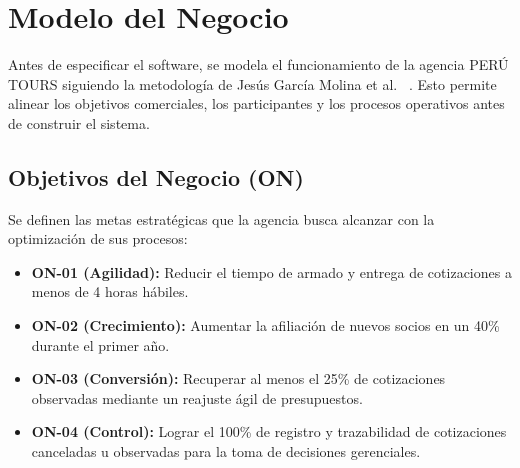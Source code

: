 \section{Modelo del Negocio}
Antes de especificar el software, se modela el funcionamiento de la agencia PERÚ TOURS siguiendo la metodología de Jesús García Molina et al.~\cite{garciamolina} %
. Esto permite alinear los objetivos comerciales, los participantes y los procesos operativos antes de construir el sistema.

\subsection{Objetivos del Negocio (ON)}
Se definen las metas estratégicas que la agencia busca alcanzar con la optimización de sus procesos:
\begin{itemize}[noitemsep]
    \item \textbf{ON-01 (Agilidad):} Reducir el tiempo de armado y entrega de cotizaciones a menos de 4 horas hábiles.
    \item \textbf{ON-02 (Crecimiento):} Aumentar la afiliación de nuevos socios en un 40\% durante el primer año.
    \item \textbf{ON-03 (Conversión):} Recuperar al menos el 25\% de cotizaciones observadas mediante un reajuste ágil de presupuestos.
    \item \textbf{ON-04 (Control):} Lograr el 100\% de registro y trazabilidad de cotizaciones canceladas u observadas para la toma de decisiones gerenciales.
\end{itemize}


